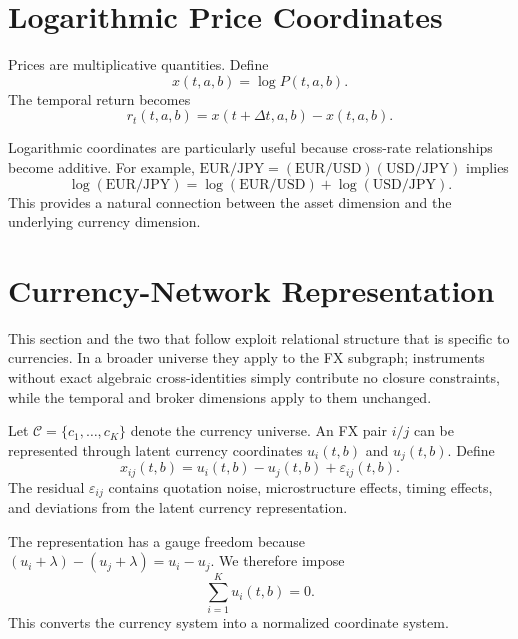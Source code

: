\documentclass[11pt,a4paper]{article}
\numberwithin{equation}{section}
\newcommand{\Cset}{\mathcal{C}}
\begin{document}
\section{Logarithmic Price Coordinates}

Prices are multiplicative quantities. Define
\begin{equation}
x(t,a,b)=\log P(t,a,b).
\label{eq:logprice}
\end{equation}
The temporal return becomes
\begin{equation}
r_t(t,a,b)=x(t+\Delta t,a,b)-x(t,a,b).
\label{eq:return}
\end{equation}

Logarithmic coordinates are particularly useful because cross-rate
relationships become additive. For example,
$\mathrm{EUR/JPY}=(\mathrm{EUR/USD})(\mathrm{USD/JPY})$ implies
\[
\log(\mathrm{EUR/JPY})
=\log(\mathrm{EUR/USD})+\log(\mathrm{USD/JPY}).
\]
This provides a natural connection between the asset dimension and
the underlying currency dimension.

\section{Currency-Network Representation}

This section and the two that follow exploit relational structure
that is specific to currencies. In a broader universe they apply to
the FX subgraph; instruments without exact algebraic
cross-identities simply contribute no closure constraints, while the
temporal and broker dimensions apply to them unchanged.

Let $\Cset=\{c_1,\ldots,c_K\}$ denote the currency universe. An FX
pair $i/j$ can be represented through latent currency coordinates
$u_i(t,b)$ and $u_j(t,b)$. Define
\begin{equation}
x_{ij}(t,b)=u_i(t,b)-u_j(t,b)+\varepsilon_{ij}(t,b).
\label{eq:currency_factor}
\end{equation}
The residual $\varepsilon_{ij}$ contains quotation noise,
microstructure effects, timing effects, and deviations from the
latent currency representation.

The representation has a gauge freedom because
$(u_i+\lambda)-(u_j+\lambda)=u_i-u_j$. We therefore impose
\begin{equation}
\sum_{i=1}^{K}u_i(t,b)=0.
\label{eq:gauge}
\end{equation}
This converts the currency system into a normalized coordinate
system.
\end{document}
